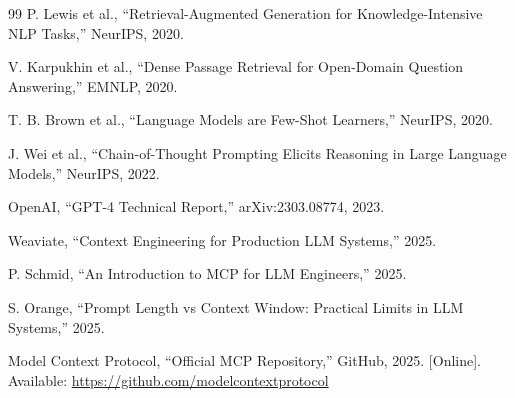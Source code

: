 \documentclass[conference]{IEEEtran}
\begin{document}
\begin{thebibliography}{99}
P. Lewis et al.,
``Retrieval-Augmented Generation for Knowledge-Intensive NLP Tasks,''
NeurIPS,
2020.

V. Karpukhin et al.,
``Dense Passage Retrieval for Open-Domain Question Answering,''
EMNLP,
2020.

T. B. Brown et al.,
``Language Models are Few-Shot Learners,''
NeurIPS,
2020.

J. Wei et al.,
``Chain-of-Thought Prompting Elicits Reasoning in Large Language Models,''
NeurIPS,
2022.

OpenAI,
``GPT-4 Technical Report,''
arXiv:2303.08774,
2023.

Weaviate,
``Context Engineering for Production LLM Systems,''
2025.

P. Schmid,
``An Introduction to MCP for LLM Engineers,''
2025.

S. Orange,
``Prompt Length vs Context Window: Practical Limits in LLM Systems,''
2025.

Model Context Protocol,
``Official MCP Repository,''
GitHub,
2025.
[Online].
Available:
\url{https://github.com/modelcontextprotocol}

\end{thebibliography}
\end{document}
